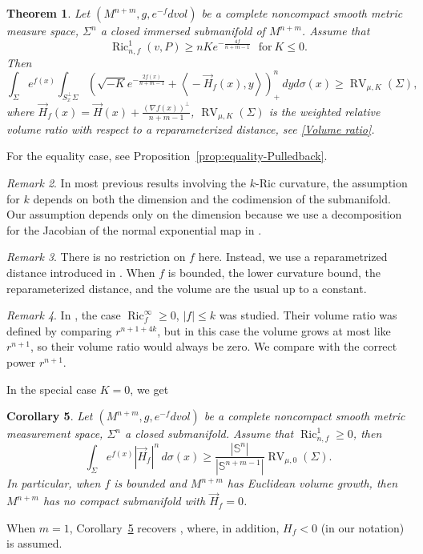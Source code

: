 \documentclass[psamsfonts]{amsart}
\newtheorem{thm}{Theorem}[section]
\newtheorem{cor}[thm]{Corollary}
\theoremstyle{definition}
\theoremstyle{remark}
\newtheorem{rem}[thm]{Remark}
\DeclareMathOperator{\Ric}{Ric}
\numberwithin{equation}{section}
\begin{document}
    \begin{thm} \label{main theorem}
Let $(M^{n+m}, g, e^{-f}dvol)$ be a complete noncompact smooth metric measure space,  $\Sigma^n$ a closed immersed submanifold of $M^{n+m}$. 
Assume that
\begin{equation}\label{Curvature-assumption}
    \operatorname{Ric}^{1}_{n,f} (v, P)
\geq
n K e^{-\frac{4f}{n+m-1}} \ \ \ \mbox{for} \ K \le 0. 
\end{equation}
Then
\[
 \int_\Sigma e^{f(x)}\!\int_{S^\perp_x \Sigma} \!\left( \! \sqrt{-K} e^{-\frac{2f(x)}{n+m-1}} + \!\left\langle \! -\vec H_f(x), y \right\rangle\right)_+^n\,dy d\sigma(x) 
 \ge \operatorname{RV}_{\mu,K}(\Sigma), 
\]
where $\vec H_f(x) = \vec H(x) + \frac{(\nabla f(x))^\perp}{n+m-1}$,
$\operatorname{RV}_{\mu,K}(\Sigma)$ is the weighted relative volume ratio with respect to a reparameterized distance, see \eqref{Volume ratio}. 
\end{thm}
For the equality case, see Proposition~\ref{prop:equality-Pulledback}. 

\begin{rem}
   In most previous results involving the $k$-Ric curvature, the assumption for $k$ depends on both the dimension and the codimension of the submanifold. Our assumption depends only on the dimension because we use a decomposition for the Jacobian of the normal exponential map in \cite[Lemma 3.2]{Pan-Yi2026}.    
\end{rem}
\begin{rem} There is no restriction on $f$ here. Instead, we use a reparametrized distance introduced in \cite{wylie2016geometry}. 
   When $f$  is bounded, the lower curvature bound, the reparameterized distance, and the volume are the usual up to a constant. 
\end{rem}
\begin{rem}
 In \cite{wuwu2024}, the case $\Ric_f^\infty \ge0$, $|f| \le k$ was studied.    Their volume ratio was defined by comparing  $r^{n+1 +4k}$, but in this case the volume grows at most like $r^{n+1}$, so their volume ratio would always be zero. We compare with the correct power $r^{n+1}$. 
\end{rem}
In the special case $K=0$, we get 
\begin{cor}  \label{Corollary K=0}
Let $(M^{n+m}, g, e^{-f}dvol)$ be a complete noncompact smooth metric measurement space,  $\Sigma^n$ a closed submanifold. Assume that $\operatorname{Ric}_{n,f}^{1} \ge 0$, then
\begin{equation}
\int_\Sigma e^{f(x)}  |\vec{H}_f|^n\,d\sigma(x) 
 \ge \frac{|\mathbb{S}^n|}{|\mathbb{S}^{n+m-1}|} \operatorname{RV}_{\mu,0}(\Sigma).  \label{K=0}
\end{equation}
In particular, when $f$ is bounded and $M^{n+m}$ has Euclidean volume growth, then $M^{n+m}$ has no compact submanifold with $\vec{H}_f =0$.
\end{cor}
When $m=1$, Corollary~\ref{Corollary K=0} recovers \cite[Theorem 4.10]{borghini2023comparison}, where, in addition, $H_f<0$ (in our notation) is assumed. 
\end{document}
